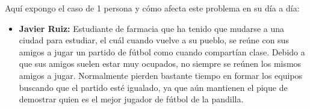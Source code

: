 Aquí expongo el caso de 1 persona y cómo afecta este problema en su día a día:

\begin{itemize}
    \item \textbf{Javier Ruiz:} Estudiante de farmacia que ha tenido que mudarse a una ciudad para estudiar, el cuál cuando vuelve a su pueblo,
     se reúne con sus amigos a jugar un partido de fútbol como cuando compartían clase. Debido a que sus amigos suelen estar muy ocupados,
     no siempre se reúnen los mismos amigos a jugar. Normalmente pierden bastante tiempo en formar los equipos buscando que el partido esté igualado,
     ya que aún mantienen el pique de demostrar quien es el mejor jugador de fútbol de la pandilla. 
    
\end{itemize}
